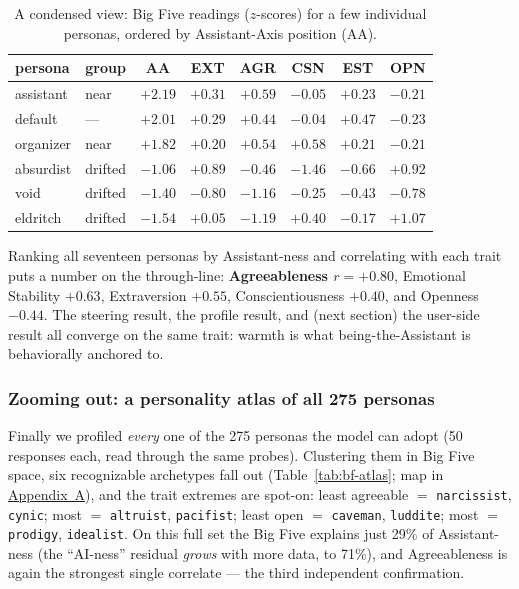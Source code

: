 \documentclass[11pt]{article}
\begin{document}
\begin{table}[h]
\centering\small
\caption{A condensed view: Big Five readings ($z$-scores) for a few individual
personas, ordered by Assistant-Axis position (AA).}
\label{tab:bf-roles}
\begin{tabular}{llcccccc}
\toprule
persona & group & AA & EXT & AGR & CSN & EST & OPN \\
\midrule
assistant & near   & $+2.19$ & $+0.31$ & $+0.59$ & $-0.05$ & $+0.23$ & $-0.21$ \\
default   & ---    & $+2.01$ & $+0.29$ & $+0.44$ & $-0.04$ & $+0.47$ & $-0.23$ \\
organizer & near   & $+1.82$ & $+0.20$ & $+0.54$ & $+0.58$ & $+0.21$ & $-0.21$ \\
\midrule
absurdist & drifted & $-1.06$ & $+0.89$ & $-0.46$ & $-1.46$ & $-0.66$ & $+0.92$ \\
void      & drifted & $-1.40$ & $-0.80$ & $-1.16$ & $-0.25$ & $-0.43$ & $-0.78$ \\
eldritch  & drifted & $-1.54$ & $+0.05$ & $-1.19$ & $+0.40$ & $-0.17$ & $+1.07$ \\
\bottomrule
\end{tabular}
\end{table}

Ranking all seventeen personas by Assistant-ness and correlating with each
trait puts a number on the through-line: \textbf{Agreeableness $r = +0.80$},
Emotional Stability $+0.63$, Extraversion $+0.55$, Conscientiousness $+0.40$,
and Openness $\mathbf{-0.44}$. The steering result, the profile result, and
(next section) the user-side result all converge on the same trait: warmth is
what being-the-Assistant is behaviorally anchored to.

\subsubsection{Zooming out: a personality atlas of all 275 personas}

Finally we profiled \emph{every} one of the 275 personas the model can adopt
(50 responses each, read through the same probes). Clustering them in Big Five
space, six recognizable archetypes fall out (Table~\ref{tab:bf-atlas}; map in
\hyperref[app:figs]{Appendix~A}), and the trait extremes are spot-on: least agreeable
$=$ \texttt{narcissist}, \texttt{cynic}; most $=$ \texttt{altruist},
\texttt{pacifist}; least open $=$ \texttt{caveman}, \texttt{luddite}; most $=$
\texttt{prodigy}, \texttt{idealist}. On this full set the Big Five explains
just 29\% of Assistant-ness (the ``AI-ness'' residual \emph{grows} with more
data, to 71\%), and Agreeableness is again the strongest single correlate ---
the third independent confirmation.
\end{document}
